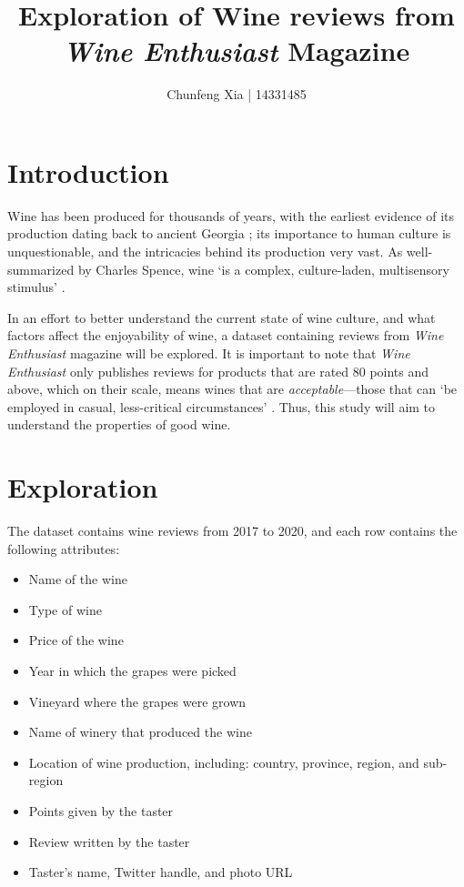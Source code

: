 \documentclass[11pt, twocolumn]{article}
\begin{document}
\title{Exploration of Wine reviews from \emph{Wine Enthusiast} Magazine}
\author{Chunfeng Xia | 14331485}
\date{}
\maketitle

\section{Introduction}
Wine has been produced for thousands of years, with the earliest evidence of its production dating back to ancient Georgia \cite{McGovernJalabadze2017}; its importance to human culture is unquestionable, and the intricacies behind its production very vast. As well-summarized by Charles Spence, wine `is a complex, culture-laden, multisensory stimulus' \cite{Spence2020}.

In an effort to better understand the current state of wine culture, and what  factors affect the enjoyability of wine, a dataset containing reviews from \emph{Wine Enthusiast} magazine will be explored. It is important to note that \emph{Wine Enthusiast} only publishes reviews for products that are rated 80 points and above, which on their scale, means wines that are \emph{acceptable}---those that can `be employed in casual, less-critical circumstances' \cite{WineMag}. Thus, this study will aim to understand the properties of good wine.

\section{Exploration}
The dataset contains wine reviews from 2017 to 2020, and each row contains the following attributes:
\begin{itemize}
    \setlength\itemsep{0.1em}
    \item Name of the wine
    \item Type of wine
    \item Price of the wine
    \item Year in which the grapes were picked
    \item Vineyard where the grapes were grown
    \item Name of winery that produced the wine
    \item Location of wine production, including: country, province, region, and sub-region
    \item Points given by the taster
    \item Review written by the taster
    \item Taster's name, Twitter handle, and photo URL
\end{itemize}
\end{document}
